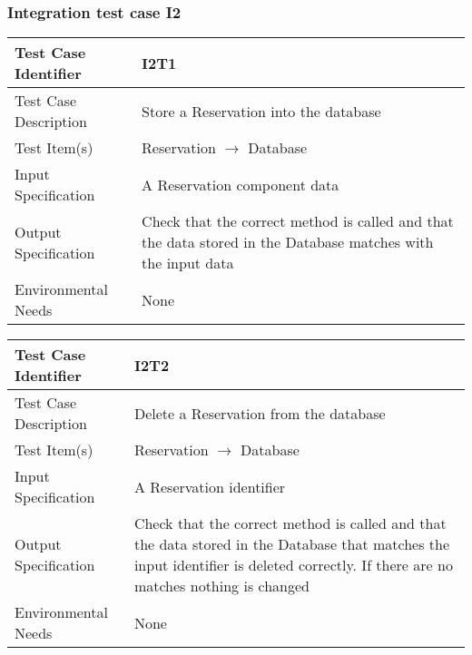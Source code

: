 		\subsubsection{Integration test case I2}
		\begin{center}
			\begin{tabular}{ |l p{10cm}| } \hline
				Test Case Identifier & I2T1 \\ \hline
				Test Case Description & Store a Reservation into the database \\ \hline
				Test Item(s) & Reservation $\rightarrow$ Database \\ \hline
				Input Specification & A Reservation component data \\ \hline
				Output Specification & Check that the correct method is called and that the data stored in the Database
				matches with the input data \\ \hline
				Environmental Needs & None \\ \hline
			\end{tabular}
			\begin{tabular}{ |l p{10cm}| } \hline
				Test Case Identifier & I2T2 \\ \hline
				Test Case Description & Delete a Reservation from the database \\ \hline
				Test Item(s) & Reservation $\rightarrow$ Database \\ \hline
				Input Specification & A Reservation identifier \\ \hline
				Output Specification & Check that the correct method is called and that the data stored in the Database
				that matches the input identifier is deleted correctly. If there are no matches nothing is changed \\ \hline
				Environmental Needs & None \\ \hline
			\end{tabular}
		\end{center}
